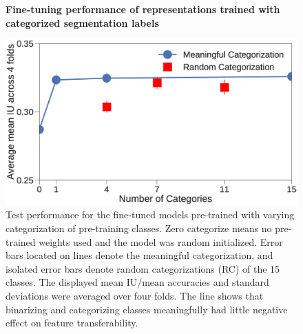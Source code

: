 
\begin{figure}[t]
\centering
\textbf{Fine-tuning performance of representations trained with categorized segmentation labels}\par\medskip
   \includegraphics[width=1.\linewidth]{img/num_classes.eps}
\caption{
Test performance for the fine-tuned models pre-trained with varying categorization of pre-training classes.
Zero categorize means no pre-trained weights used and the model was random initialized.
Error bars located on lines denote the meaningful categorization, and isolated error bars denote random categorizations (RC) of the 15 classes.
The displayed mean IU/mean accuracies and standard deviations were averaged over four folds.
The line shows that binarizing and categorizing classes meaningfully had little negative effect on feature transferability.
}
\label{fig:categories}
\end{figure}



